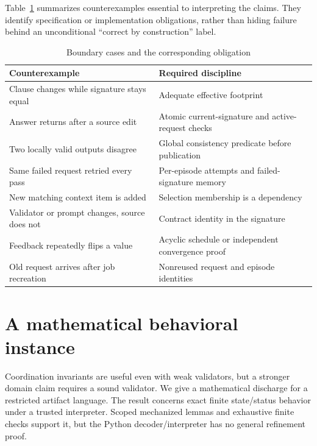 \documentclass[pdflatex,sn-mathphys-num]{sn-jnl}
\theoremstyle{thmstyleone}
\theoremstyle{thmstylethree}
\theoremstyle{thmstyletwo}
\begin{document}
Table~\ref{tab:boundaries} summarizes counterexamples essential to interpreting the claims. They identify specification or implementation obligations, rather than hiding failure behind an unconditional ``correct by construction'' label.
\begin{table}[tb]
\caption{Boundary cases and the corresponding obligation}\label{tab:boundaries}
\small\begin{tabularx}{\linewidth}{@{}XX@{}}\toprule
Counterexample & Required discipline\\\midrule
Clause changes while signature stays equal & Adequate effective footprint\\
Answer returns after a source edit & Atomic current-signature and active-request checks\\
Two locally valid outputs disagree & Global consistency predicate before publication\\
Same failed request retried every pass & Per-episode attempts and failed-signature memory\\
New matching context item is added & Selection membership is a dependency\\
Validator or prompt changes, source does not & Contract identity in the signature\\
Feedback repeatedly flips a value & Acyclic schedule or independent convergence proof\\
Old request arrives after job recreation & Nonreused request and episode identities\\\bottomrule
\end{tabularx}
\end{table}

\section{A mathematical behavioral instance}\label{sec:discharged}
Coordination invariants are useful even with weak validators, but a stronger domain claim requires a sound validator. We give a mathematical discharge for a restricted artifact language. The result concerns exact finite state/status behavior under a trusted interpreter. Scoped mechanized lemmas and exhaustive finite checks support it, but the Python decoder/interpreter has no general refinement proof.
\end{document}

